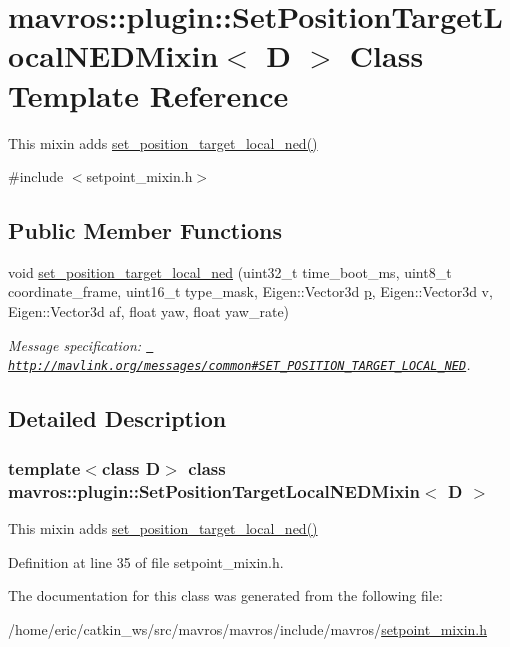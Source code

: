 \hypertarget{classmavros_1_1plugin_1_1SetPositionTargetLocalNEDMixin}{}\section{mavros\+::plugin\+::Set\+Position\+Target\+Local\+N\+E\+D\+Mixin$<$ D $>$ Class Template Reference}
\label{classmavros_1_1plugin_1_1SetPositionTargetLocalNEDMixin}


This mixin adds \mbox{\hyperlink{group__plugin_ga9144d4820f4e4d8146c977ba81a59579}{set\+\_\+position\+\_\+target\+\_\+local\+\_\+ned()}}  




{\ttfamily \#include $<$setpoint\+\_\+mixin.\+h$>$}

\subsection*{Public Member Functions}
\begin{DoxyCompactItemize}
\item 
void \mbox{\hyperlink{group__plugin_ga9144d4820f4e4d8146c977ba81a59579}{set\+\_\+position\+\_\+target\+\_\+local\+\_\+ned}} (uint32\+\_\+t time\+\_\+boot\+\_\+ms, uint8\+\_\+t coordinate\+\_\+frame, uint16\+\_\+t type\+\_\+mask, Eigen\+::\+Vector3d \mbox{\hyperlink{velTest_8cpp_a739e18b8b6d072d434ebcb6ca486abb0}{p}}, Eigen\+::\+Vector3d v, Eigen\+::\+Vector3d af, float yaw, float yaw\+\_\+rate)
\begin{DoxyCompactList}\small\item\em Message specification\+: {\ttfamily \href{http://mavlink.org/messages/common\#SET_POSITION_TARGET_LOCAL_NED}{\texttt{ http\+://mavlink.\+org/messages/common\#\+S\+E\+T\+\_\+\+P\+O\+S\+I\+T\+I\+O\+N\+\_\+\+T\+A\+R\+G\+E\+T\+\_\+\+L\+O\+C\+A\+L\+\_\+\+N\+ED}}}. \end{DoxyCompactList}\end{DoxyCompactItemize}


\subsection{Detailed Description}
\subsubsection*{template$<$class D$>$\newline
class mavros\+::plugin\+::\+Set\+Position\+Target\+Local\+N\+E\+D\+Mixin$<$ D $>$}

This mixin adds \mbox{\hyperlink{group__plugin_ga9144d4820f4e4d8146c977ba81a59579}{set\+\_\+position\+\_\+target\+\_\+local\+\_\+ned()}} 

Definition at line 35 of file setpoint\+\_\+mixin.\+h.



The documentation for this class was generated from the following file\+:\begin{DoxyCompactItemize}
\item 
/home/eric/catkin\+\_\+ws/src/mavros/mavros/include/mavros/\mbox{\hyperlink{setpoint__mixin_8h}{setpoint\+\_\+mixin.\+h}}\end{DoxyCompactItemize}
